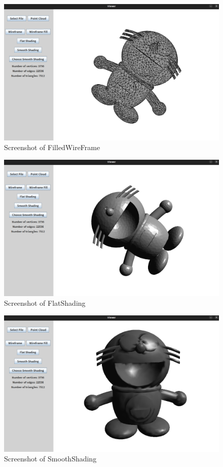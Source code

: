 \documentclass[12pt]{article}
\begin{document}
\begin{figure}[h]
    \centering
    \includegraphics[width=1.0\textwidth]{sc3.png}
    \caption{Screenshot of FilledWireFrame}
    \label{fig:my_label}
\end{figure}

\begin{figure}[h]
    \centering
    \includegraphics[width=1.0\textwidth]{sc4.png}
    \caption{Screenshot of FlatShading}
    \label{fig:my_label}
\end{figure}

\begin{figure}[h]
    \centering
    \includegraphics[width=1.0\textwidth]{sc5.png}
    \caption{Screenshot of SmoothShading}
    \label{fig:my_label}
\end{figure}
\end{document}
